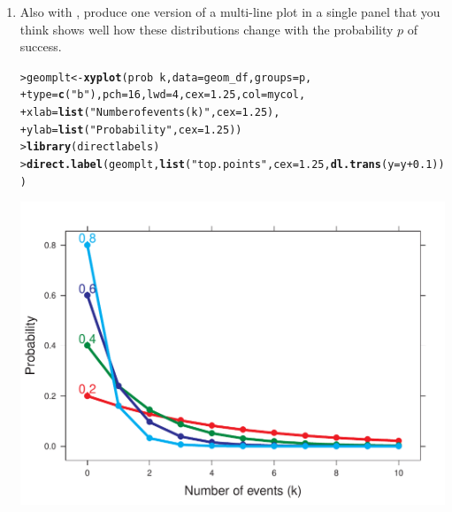 \documentclass[10pt]{report}\usepackage[]{graphicx}\usepackage[]{color}
\makeatletter
\newcommand{\hlnum}[1]{\textcolor[rgb]{0.686,0.059,0.569}{#1}}%
\newcommand{\hlstr}[1]{\textcolor[rgb]{0.192,0.494,0.8}{#1}}%
\newcommand{\hlopt}[1]{\textcolor[rgb]{0,0,0}{#1}}%
\newcommand{\hlstd}[1]{\textcolor[rgb]{0.345,0.345,0.345}{#1}}%
\newcommand{\hlkwb}[1]{\textcolor[rgb]{0.69,0.353,0.396}{#1}}%
\newcommand{\hlkwc}[1]{\textcolor[rgb]{0.333,0.667,0.333}{#1}}%
\newcommand{\hlkwd}[1]{\textcolor[rgb]{0.737,0.353,0.396}{\textbf{#1}}}%
\newenvironment{kframe}{%
 \def\at@end@of@kframe{}%
 \ifinner\ifhmode%
  \def\at@end@of@kframe{\end{minipage}}%
  \begin{minipage}{\columnwidth}%
 \fi\fi%
 \def\FrameCommand##1{\hskip\@totalleftmargin \hskip-\fboxsep
 \colorbox{shadecolor}{##1}\hskip-\fboxsep
     \hskip-\linewidth \hskip-\@totalleftmargin \hskip\columnwidth}%
 \MakeFramed {\advance\hsize-\width
   \@totalleftmargin\z@ \linewidth\hsize
   \@setminipage}}%
 {\par\unskip\endMakeFramed%
 \at@end@of@kframe}
\newenvironment{knitrout}{}{} %
\renewenvironment{knitrout}{\small\renewcommand{\baselinestretch}{.85}}{} %
\makeatother
\begin{document}
\begin{Exercises}
\begin{enumerate}
    \item Also with , produce one version of a multi-line plot
    in a single panel that you think shows well how these distributions change
    with the probability $p$ of success.
    \begin{ans}
\begin{knitrout}\footnotesize
{}\color{fgcolor}\begin{kframe}
\begin{alltt}
\hlstd{> }\hlstd{geomplt}\hlkwb{<-}\hlkwd{xyplot}\hlstd{(prob} \hlopt{~} \hlstd{k ,} \hlkwc{data} \hlstd{= geom_df,} \hlkwc{groups} \hlstd{= p,}
\hlstd{+ }                \hlkwc{type} \hlstd{=} \hlkwd{c}\hlstd{(}\hlstr{"b"}\hlstd{),} \hlkwc{pch} \hlstd{=} \hlnum{16}\hlstd{,} \hlkwc{lwd} \hlstd{=} \hlnum{4}\hlstd{,} \hlkwc{cex} \hlstd{=} \hlnum{1.25}\hlstd{,} \hlkwc{col} \hlstd{= mycol,}
\hlstd{+ }                \hlkwc{xlab} \hlstd{=} \hlkwd{list}\hlstd{(}\hlstr{"Number of events (k)"}\hlstd{,} \hlkwc{cex} \hlstd{=} \hlnum{1.25}\hlstd{),}
\hlstd{+ }                \hlkwc{ylab} \hlstd{=} \hlkwd{list}\hlstd{(}\hlstr{"Probability"}\hlstd{,} \hlkwc{cex} \hlstd{=} \hlnum{1.25}\hlstd{))}
\hlstd{> }\hlkwd{library}\hlstd{(directlabels)}
\hlstd{> }\hlkwd{direct.label}\hlstd{(geomplt,} \hlkwd{list}\hlstd{(}\hlstr{"top.points"}\hlstd{,} \hlkwc{cex} \hlstd{=} \hlnum{1.25}\hlstd{,} \hlkwd{dl.trans}\hlstd{(}\hlkwc{y} \hlstd{= y} \hlopt{+} \hlnum{0.1}\hlstd{)))}
\end{alltt}
\end{kframe}

\centerline{\includegraphics[width=.5\textwidth]{soln/fig/ex3_2b-1} }



\end{knitrout}
    \end{ans}
    

\end{enumerate}
\end{Exercises}
\end{document}
